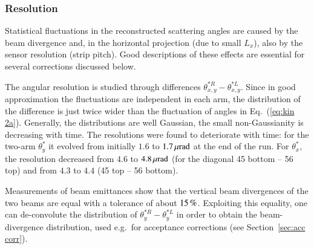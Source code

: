 


\subsubsection{Resolution}
\label{sec:resolution}

Statistical fluctuations in the reconstructed scattering angles are caused by 
the beam divergence and, in the horizontal projection (due to small $L_x$), 
also by the sensor resolution (strip pitch). Good descriptions of these effects
are essential for several corrections discussed below.

The angular resolution is studied through differences $\theta_{x,y}^{*R} - \theta_{x,y}^{*L}$. Since in good approximation the fluctuations are independent in each arm, the distribution of the difference is just twice wider than the fluctuation of angles in Eq.~(\ref{eq:kin 2a}). Generally, the distributions are well Gaussian, the small non-Gaussianity is decreasing with time. The resolutions were found to deteriorate with time: for the two-arm $\theta_y^*$ it evolved from initially $1.6$ to $1.7\,{\rm \mu rad}$ at the end of the run. For $\theta_x^*$, the resolution decreased from $4.6$ to $4.8\,{\rm \mu rad}$ (for the diagonal 45 bottom -- 56 top) and from $4.3$ to $4.4$ (45 top -- 56 bottom).

Measurements of beam emittances show that the vertical beam divergences of the two beams are equal with a tolerance of about $15\,{\rm \%}$. Exploiting this equality, one can de-convolute the distribution of $\theta_y^{*R} - \theta_y^{*L}$ in order to obtain the beam-divergence distribution, used e.g.~for acceptance corrections (see Section~\ref{sec:acc corr}).


